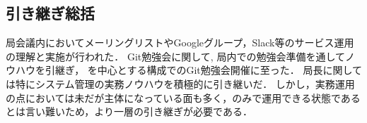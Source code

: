 \subsection*{引き継ぎ総括}


局会議内においてメーリングリストやGoogleグループ，Slack等のサービス運用の理解と実施が行われた．
Git勉強会に関して, 局内での勉強会準備を通してノウハウを引継ぎ， \secondGrade{}を中心とする構成でのGit勉強会開催に至った．
局長に関しては特にシステム管理の実務ノウハウを積極的に引き継いだ．
しかし，実務運用の点においては未だ\fourthGrade{}が主体になっている面も多く，\secondGrade{}のみで運用できる状態であるとは言い難いため，より一層の引き継ぎが必要である．
